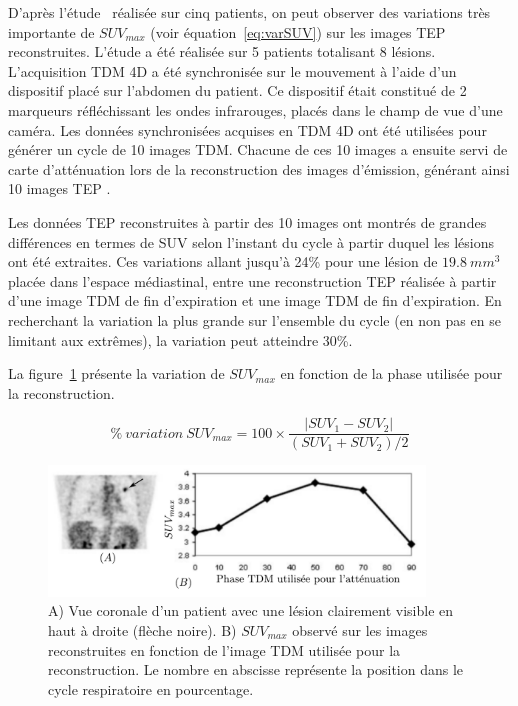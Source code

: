 D'après l'étude~\cite{erdi2004ct} réalisée sur cinq patients, on peut observer des variations très importante de $SUV_{max}$ (voir équation~\ref{eq:varSUV}) sur les images TEP reconstruites. L'étude a été réalisée sur 5 patients totalisant 8 lésions. L'acquisition TDM 4D a été synchronisée sur le mouvement à l'aide d'un dispositif placé sur l'abdomen du patient. Ce dispositif était constitué de 2 marqueurs réfléchissant les ondes infrarouges, placés dans le champ de vue d'une caméra. Les données synchronisées acquises en TDM 4D ont été utilisées pour générer un cycle de 10 images TDM. Chacune de ces 10 images a ensuite servi de carte d'atténuation lors de la reconstruction des images d'émission, générant ainsi 10 images TEP .

Les données TEP reconstruites à partir des 10 images ont montrés de grandes différences en termes de SUV selon l'instant du cycle à partir duquel les lésions ont été extraites.
Ces variations allant jusqu'à 24\% pour une lésion de $19.8~mm^3$ placée dans l'espace médiastinal, entre une reconstruction TEP réalisée à partir d'une image TDM de fin d'expiration et une image TDM de fin d'expiration. En recherchant la variation la plus grande sur l'ensemble du cycle (en non pas en se limitant aux extrêmes), la variation peut atteindre 30\%.

La figure~\ref{fig:lesionEnFctPhaseTDM} présente la variation de $SUV_{max}$ en fonction de la phase utilisée pour la reconstruction.

\begin{equation}
\label{eq:varSUV}
 \%~variation~SUV_{max} = 100 \times \frac{ | SUV_1 - SUV_2 | }{ (SUV_1 + SUV_2) / 2 }
\end{equation}

\begin{figure}[h!]
	\vspace{0.5cm}
	\centering
			\includegraphics[width=10cm]{images/lesionEnFctPhaseTDM}
	\vspace{-0.5cm}
	\caption[Influence de l'influence de la carte d'atténuation sur l'activité des lésions] {A) Vue coronale d'un patient avec une lésion clairement visible en haut à droite (flèche noire).  B) $SUV_{max}$ observé sur les images reconstruites en fonction de l'image TDM utilisée pour la reconstruction. Le nombre en abscisse représente la position dans le cycle respiratoire en pourcentage.} 
	\label{fig:lesionEnFctPhaseTDM}
\end{figure}

